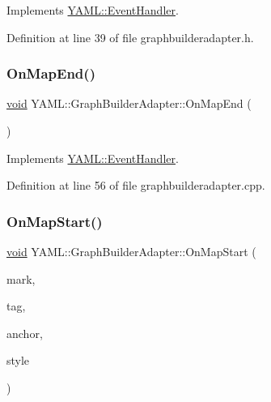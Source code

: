 Implements \mbox{\hyperlink{class_y_a_m_l_1_1_event_handler_adb739beb59e227bd320aab1e61bf42e4}{Y\+A\+M\+L\+::\+Event\+Handler}}.



Definition at line 39 of file graphbuilderadapter.\+h.

\mbox{\label{class_y_a_m_l_1_1_graph_builder_adapter_ad117ea7f74cdef8b2bb2243e5e399f49}} 
\subsubsection{\texorpdfstring{OnMapEnd()}{OnMapEnd()}}
{\footnotesize\ttfamily \mbox{\hyperlink{glad_8h_a950fc91edb4504f62f1c577bf4727c29}{void}} Y\+A\+M\+L\+::\+Graph\+Builder\+Adapter\+::\+On\+Map\+End (\begin{DoxyParamCaption}{ }\end{DoxyParamCaption})\hspace{0.3cm}{\ttfamily [virtual]}}



Implements \mbox{\hyperlink{class_y_a_m_l_1_1_event_handler_a6b8821803de4ecca96a05c3296fb565f}{Y\+A\+M\+L\+::\+Event\+Handler}}.



Definition at line 56 of file graphbuilderadapter.\+cpp.

\mbox{\label{class_y_a_m_l_1_1_graph_builder_adapter_ae4fff97022af791cad7e9ef834756db6}} 
\subsubsection{\texorpdfstring{OnMapStart()}{OnMapStart()}}
{\footnotesize\ttfamily \mbox{\hyperlink{glad_8h_a950fc91edb4504f62f1c577bf4727c29}{void}} Y\+A\+M\+L\+::\+Graph\+Builder\+Adapter\+::\+On\+Map\+Start (\begin{DoxyParamCaption}\item[{const \mbox{\hyperlink{struct_y_a_m_l_1_1_mark}{Mark}} \&}]{mark,  }\item[{const \mbox{\hyperlink{glad_8h_ac83513893df92266f79a515488701770}{std\+::string}} \&}]{tag,  }\item[{\mbox{\hyperlink{namespace_y_a_m_l_abeff1798814ae3402fc5665fdcad1de6}{anchor\+\_\+t}}}]{anchor,  }\item[{\mbox{\hyperlink{struct_y_a_m_l_1_1_emitter_style_ae86640662c85ce6062a37f9636b6959f}{Emitter\+Style\+::value}}}]{style }\end{DoxyParamCaption})\hspace{0.3cm}{\ttfamily [virtual]}}




